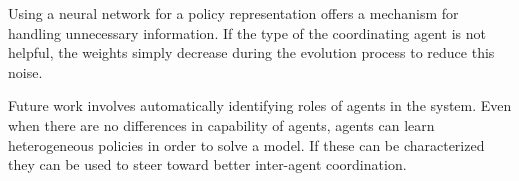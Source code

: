 \documentclass{aamas2014}
\begin{document}
Using a neural network for a policy representation offers a mechanism for handling unnecessary information. If the type of the coordinating agent is not helpful, the weights simply decrease during the evolution process to reduce this noise.

Future work involves automatically identifying roles of agents in the system. Even when there are no differences in capability of agents, agents can learn heterogeneous policies in order to solve a model. If these can be characterized they can be used to steer toward better inter-agent coordination.





%
%
%
%
%
%
%
%
%
%
%
%
%
%
%
\end{document}

